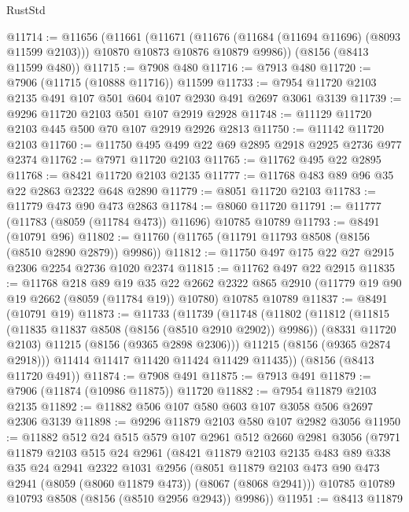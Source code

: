 \begin{lexlean}{RustStd}
\begin{coremodule}
{\begin{coremodule}
{{{{{{{{{{{{{{{{{{{{{{{{{{{{{{{{{{@11714 := @11656
    (@11661
      (@11671
        (@11676 (@11684 (@11694 @11696) (@8093 @11599 @2103)))
        @10870
        @10873
        @10876
        @10879
        @9986))
    (@8156 (@8413 @11599 @480))
@11715 := @7908 @480
@11716 := @7913 @480
@11720 := @7906 (@11715 (@10888 @11716)) @11599
@11733 := @7954 @11720 @2103 @2135 @491 @107 @501 @604 @107 @2930 @491 @2697 @3061 @3139
@11739 := @9296 @11720 @2103 @501 @107 @2919 @2928
@11748 := @11129 @11720 @2103 @445 @500 @70 @107 @2919 @2926 @2813
@11750 := @11142 @11720 @2103
@11760 := @11750 @495 @499 @22 @69 @2895 @2918 @2925 @2736 @977 @2374
@11762 := @7971 @11720 @2103
@11765 := @11762 @495 @22 @2895
@11768 := @8421 @11720 @2103 @2135
@11777 := @11768 @483 @89 @96 @35 @22 @2863 @2322 @648 @2890
@11779 := @8051 @11720 @2103
@11783 := @11779 @473 @90 @473 @2863
@11784 := @8060 @11720
@11791 := @11777 (@11783 (@8059 (@11784 @473)) @11696) @10785 @10789
@11793 := @8491 (@10791 @96)
@11802 := @11760 (@11765 (@11791 @11793 @8508 (@8156 (@8510 @2890 @2879)) @9986))
@11812 := @11750 @497 @175 @22 @27 @2915 @2306 @2254 @2736 @1020 @2374
@11815 := @11762 @497 @22 @2915
@11835 := @11768
    @218
    @89
    @19
    @35
    @22
    @2662
    @2322
    @865
    @2910
    (@11779 @19 @90 @19 @2662 (@8059 (@11784 @19)) @10780)
    @10785
    @10789
@11837 := @8491 (@10791 @19)
@11873 := @11733
    (@11739
      (@11748
        (@11802
          (@11812
            (@11815 (@11835 @11837 @8508 (@8156 (@8510 @2910 @2902)) @9986))
            (@8331 @11720 @2103)
            @11215
            (@8156 (@9365 @2898 @2306)))
          @11215
          (@8156 (@9365 @2874 @2918)))
        @11414
        @11417
        @11420
        @11424
        @11429
        @11435))
    (@8156 (@8413 @11720 @491))
@11874 := @7908 @491
@11875 := @7913 @491
@11879 := @7906 (@11874 (@10986 @11875)) @11720
@11882 := @7954 @11879 @2103 @2135
@11892 := @11882 @506 @107 @580 @603 @107 @3058 @506 @2697 @2306 @3139
@11898 := @9296 @11879 @2103 @580 @107 @2982 @3056
@11950 := @11882
    @512
    @24
    @515
    @579
    @107
    @2961
    @512
    @2660
    @2981
    @3056
    (@7971
      @11879
      @2103
      @515
      @24
      @2961
      (@8421
        @11879
        @2103
        @2135
        @483
        @89
        @338
        @35
        @24
        @2941
        @2322
        @1031
        @2956
        (@8051 @11879 @2103 @473 @90 @473 @2941 (@8059 (@8060 @11879 @473)) (@8067 (@8068 @2941)))
        @10785
        @10789
        @10793
        @8508
        (@8156 (@8510 @2956 @2943))
        @9986))
@11951 := @8413 @11879
}}}}}}}}}}}}}}}}}}}}}}}}}}}}}}}}}}
\end{coremodule}}
\end{coremodule}
\end{lexlean}
